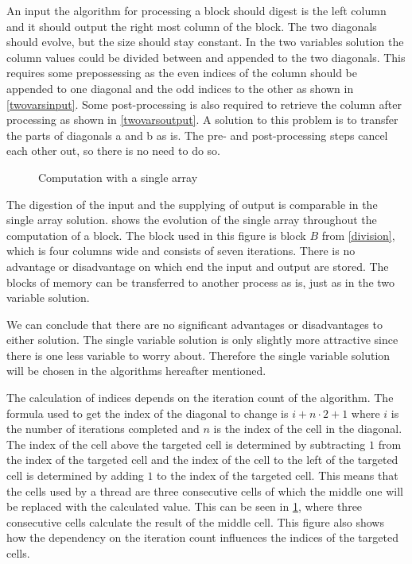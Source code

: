 An input the algorithm for processing a block should digest is the left column and it should output the right most column of the block.
The two diagonals should evolve, but the size should stay constant.
In the two variables solution the column values could be divided between and appended to the two diagonals.
This requires some prepossessing as the even indices of the column should be appended to one diagonal and the odd indices to the other as shown in \cref{twovarsinput}.
Some post-processing is also required to retrieve the column after processing as shown in \cref{twovarsoutput}.
A solution to this problem is to transfer the parts of diagonals a and b as is.
The pre- and post-processing steps cancel each other out, so there is no need to do so.

\begin{figure}[ht]
    \centering
    
    \caption{Computation with a single array} \label{singlevar}
\end{figure}

The digestion of the input and the supplying of output is comparable in the single array solution.
 shows the evolution of the single array throughout the computation of a block.
The block used in this figure is block $B$ from \cref{division}, which is four columns wide and consists of seven iterations.
There is no advantage or disadvantage on which end the input and output are stored.
The blocks of memory can be transferred to another process as is, just as in the two variable solution.

We can conclude that there are no significant advantages or disadvantages to either solution.
The single variable solution is only slightly more attractive since there is one less variable to worry about.
Therefore the single variable solution will be chosen in the algorithms hereafter mentioned.

The calculation of indices depends on the iteration count of the algorithm.
The formula used to get the index of the diagonal to change is $i + n \cdot 2 + 1$ where $i$ is the number of iterations completed and $n$ is the index of the cell in the diagonal.
The index of the cell above the targeted cell is determined by subtracting $1$ from the index of the targeted cell and the index of the cell to the left of the targeted cell is determined by adding $1$ to the index of the targeted cell.
This means that the cells used by a thread are three consecutive cells of which the middle one will be replaced with the calculated value.
This can be seen in \cref{singlevar}, where three consecutive cells calculate the result of the middle cell.
This figure also shows how the dependency on the iteration count influences the indices of the targeted cells.

